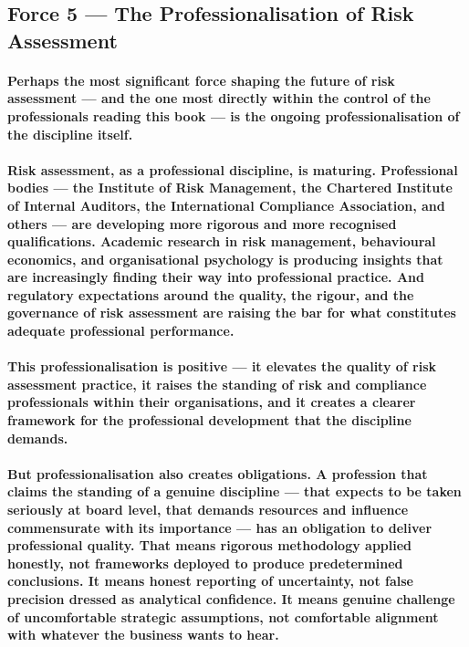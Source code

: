 \subsection{Force 5 — The Professionalisation of Risk Assessment}
\paragraph{Perhaps the most significant force shaping the future of risk assessment — and the one most directly within the control of the professionals reading this book — is the ongoing professionalisation of the discipline itself.}
\paragraph{Risk assessment, as a professional discipline, is maturing. Professional bodies — the Institute of Risk Management, the Chartered Institute of Internal Auditors, the International Compliance Association, and others — are developing more rigorous and more recognised qualifications. Academic research in risk management, behavioural economics, and organisational psychology is producing insights that are increasingly finding their way into professional practice. And regulatory expectations around the quality, the rigour, and the governance of risk assessment are raising the bar for what constitutes adequate professional performance.}
\paragraph{This professionalisation is positive — it elevates the quality of risk assessment practice, it raises the standing of risk and compliance professionals within their organisations, and it creates a clearer framework for the professional development that the discipline demands.}
\paragraph{But professionalisation also creates obligations. A profession that claims the standing of a genuine discipline — that expects to be taken seriously at board level, that demands resources and influence commensurate with its importance — has an obligation to deliver professional quality. That means rigorous methodology applied honestly, not frameworks deployed to produce predetermined conclusions. It means honest reporting of uncertainty, not false precision dressed as analytical confidence. It means genuine challenge of uncomfortable strategic assumptions, not comfortable alignment with whatever the business wants to hear.}

